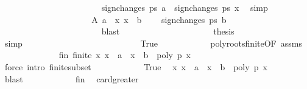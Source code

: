 \begin{isabellebody}
\ \ \ \ \ \ \ \ \ \ \ \ \ \ \ \ \ \ \ \ \ \ \isamarkupfalse%
\ {\isachardoublequoteopen}sign{\isacharunderscore}changes\ ps\ a\ {\isacharequal}\ sign{\isacharunderscore}changes\ ps\ x{\isachardoublequoteclose}\ \isamarkupfalse%
\ simp\isanewline
\ \ \ \ \ \ \ \ \ \ \ \ \ \ \ \ \ \ \isamarkupfalse%
\ \isamarkupfalse%
\ A\ {\isacharbackquoteopen}a\ {\isacharless}\ x{\isacharbackquoteclose}\ {\isacharbackquoteopen}x\ {\isasymle}\ b{\isacharbackquoteclose}\ \isamarkupfalse%
\ {\isachardoublequoteopen}{\isachardot}{\isachardot}{\isachardot}\ {\isacharequal}\ sign{\isacharunderscore}changes\ ps\ b{\isachardoublequoteclose}\isanewline
\ \ \ \ \ \ \ \ \ \ \ \ \ \ \ \ \ \ \ \ \ \ \isamarkupfalse%
\ blast\isanewline
\ \ \ \ \ \ \ \ \ \ \ \ \ \ \ \ \ \ \isamarkupfalse%
\ \isamarkupfalse%
\ {\isacharquery}thesis\ \isacommand{{\isachardot}}\isamarkupfalse%
\isanewline
\ \ \ \ \ \ \ \ \ \ \ \ \ \ \isamarkupfalse%
\ simp\isanewline
\ \ \ \ \ \ \ \ \ \ \isamarkupfalse%
\isanewline
\isanewline
\ \ \ \ \ \ \isamarkupfalse%
\isanewline
\ \ \ \ \ \ \ \ \isamarkupfalse%
\ True\isanewline
\ \ \ \ \ \ \ \ \ \ \isamarkupfalse%
\ poly{\isacharunderscore}roots{\isacharunderscore}finite{\isacharbrackleft}OF\ assms{\isacharparenleft}{}{\isacharparenright}{\isacharbrackright}\isanewline
\ \ \ \ \ \ \ \ \ \ \ \ \isamarkupfalse%
\ fin{\isacharcolon}\ {\isachardoublequoteopen}finite\ {\isacharbraceleft}x{\isachardot}\ x\ {\isachargreater}\ a\ {\isasymand}\ x\ {\isasymle}\ b\ {\isasymand}\ poly\ p\ x\ {\isacharequal}\ {}{\isacharbraceright}{\isachardoublequoteclose}\ \isanewline
\ \ \ \ \ \ \ \ \ \ \ \ \isamarkupfalse%
\ {\isacharparenleft}force\ intro{\isacharcolon}\ finite{\isacharunderscore}subset{\isacharparenright}\isanewline
\ \ \ \ \ \ \ \ \ \ \isamarkupfalse%
\ True\ \isamarkupfalse%
\ {\isachardoublequoteopen}{\isacharbraceleft}x{\isachardot}\ x\ {\isachargreater}\ a\ {\isasymand}\ x\ {\isasymle}\ b\ {\isasymand}\ poly\ p\ x\ {\isacharequal}\ {}{\isacharbraceright}\ {\isasymnoteq}\ {\isacharbraceleft}{\isacharbraceright}{\isachardoublequoteclose}\ \isamarkupfalse%
\ blast\isanewline
\ \ \ \ \ \ \ \ \ \ \isamarkupfalse%
\ fin\ \isamarkupfalse%
\ card{\isacharunderscore}greater{\isacharunderscore}{}{\isacharcolon}\isanewline

\end{isabellebody}
